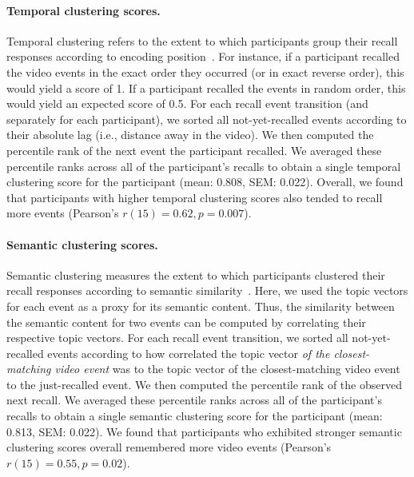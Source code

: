 \documentclass{article}
\begin{document}
\paragraph{Temporal clustering scores.} Temporal clustering refers to the extent to which participants group their recall responses according to encoding position~\citep{PolyEtal09}. For instance, if a participant recalled the video events in the exact order they occurred (or in exact reverse order), this would yield a score of 1.  If a participant recalled the events in random order, this would yield an expected score of 0.5.  For each recall event transition (and separately for each participant), we sorted all not-yet-recalled events according to their absolute lag (i.e., distance away in the video).  We then computed the percentile rank of the next event the participant recalled.  We averaged these percentile ranks across all of the participant's recalls to obtain a single temporal clustering score for the participant (mean: 0.808, SEM: 0.022).  Overall, we found that participants with higher temporal clustering scores also tended to recall more events (Pearson's $r(15) = 0.62, p = 0.007$).

\paragraph{Semantic clustering scores.} Semantic clustering measures the extent to which participants clustered their recall responses according to semantic similarity~\citep{PolyEtal09}. Here, we used the topic vectors for each event as a proxy for its semantic content. Thus, the similarity between the semantic content for two events can be computed by correlating their respective topic vectors.  For each recall event transition, we sorted all not-yet-recalled events according to how correlated the topic vector \textit{of the closest-matching video event} was to the topic vector of the closest-matching video event to the just-recalled event.  We then computed the percentile rank of the observed next recall.  We averaged these percentile ranks across all of the participant's recalls to obtain a single semantic clustering score for the participant (mean: 0.813, SEM: 0.022).  We found that participants who exhibited stronger semantic clustering scores overall remembered more video events (Pearson's $r(15) = 0.55, p = 0.02$).
\end{document}
